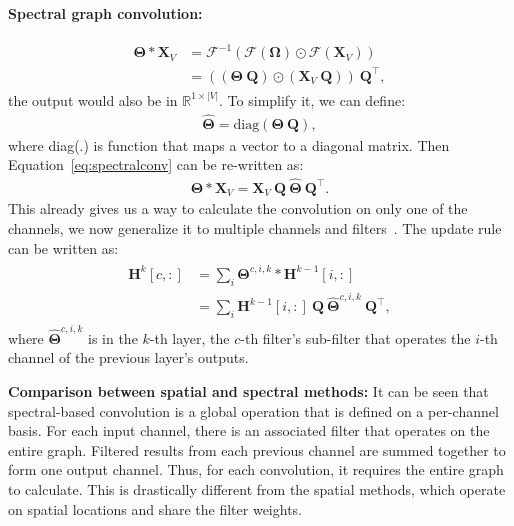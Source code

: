 \vspace{2mm}
\noindent \textbf{Spectral graph convolution:}

\begin{gather}
\label{eq:spectralconv}
\begin{split}
\mathbf{\Theta} \ast \mathbf{X}_V & = \mathcal{F}^{-1}(\mathcal{F}(\mathbf{\Omega}) \odot \mathcal{F}(\mathbf{X}_V)) \\
& = ((\mathbf{\Theta}~\mathbf{Q}) \odot (\mathbf{X}_V~\mathbf{Q}))~\mathbf{Q}^\intercal,
\end{split}
\end{gather}
the output would also be in $\mathbb{R}^{1 \times |V|}$. To simplify it, we can define:
\begin{gather}
\hat {\mathbf{\Theta}} = \text{diag}(\mathbf{\Theta}~\mathbf{Q}),
\end{gather}
where diag(.) is function that maps a vector to a diagonal matrix. Then Equation~\ref{eq:spectralconv} can be re-written as:
\begin{gather}
\label{eq:spectralconvfin}
\mathbf{\Theta} \ast \mathbf{X}_V = \mathbf{X}_V~\mathbf{Q}~\hat{\mathbf{\Theta}}~\mathbf{Q}^\intercal.
\end{gather}
This already gives us a way to calculate the convolution on only one of the channels, we now generalize it to multiple channels and filters~\cite{spectralgnn}. The update rule can be written as:
\begin{gather}
\begin{split}
\mathbf{H}^k[c, :] & = \sum_i \mathbf{\Theta}^{c, i, k} \ast \mathbf{H}^{k - 1}[i, :] \\
& = \sum_i \mathbf{H}^{k - 1}[i, :]~\mathbf{Q}~\hat{\mathbf{\Theta}}^{c, i, k}~\mathbf{Q}^\intercal,
\end{split}
\end{gather}
where $\hat{\mathbf{\Theta}}^{c, i, k}$ is in the $k$-th layer, the $c$-th filter's sub-filter that operates the $i$-th channel of the previous layer's outputs. 

\vspace{2mm}
\noindent \textbf{Comparison between spatial and spectral methods:}
It can be seen that spectral-based convolution is a global operation that is defined on a per-channel basis. For each input channel, there is an associated filter that operates on the entire graph. Filtered results from each previous channel are summed together to form one output channel. Thus, for each convolution, it requires the entire graph to calculate. This is drastically different from the spatial methods, which operate on spatial locations and share the filter weights. 



